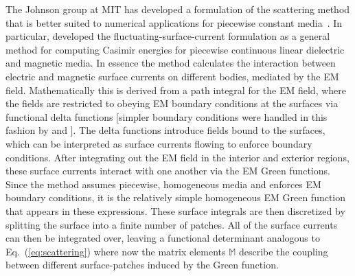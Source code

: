The Johnson group at MIT has developed a formulation of the scattering method that is better suited to numerical 
applications for piecewise constant media~\citep{Rodriguez2007,Rodriguez2007a, Rodriguez2009,Reid2009,Reid2011, Reid2013}.  
In particular, \citet{Reid2009,Reid2011, Reid2013} developed the fluctuating-surface-current formulation as a general method for computing Casimir
energies for piecewise continuous linear dielectric and magnetic media.  
In essence the method calculates the interaction between electric and magnetic surface currents 
on different bodies, mediated by the EM field.  Mathematically this is derived 
from a path integral for the EM field, where the fields are restricted to obeying EM boundary conditions at the 
surfaces via functional delta functions [simpler boundary conditions were handled in this fashion by
\citet{Bordag1985} and \citet{Li1991}].  The delta functions introduce fields 
bound to the surfaces, which can be interpreted as surface currents flowing to enforce boundary conditions.
After integrating out the EM field in the interior and exterior regions, 
these surface currents interact with one another via the EM Green functions.
Since the method assumes piecewise, homogeneous media and enforces EM boundary
conditions, it is the relatively simple homogeneous EM Green function that appears in these expressions.
These surface integrals are then discretized by splitting the surface into a finite number of patches.
All of the surface currents can then be integrated over, leaving a functional determinant analogous to Eq.~(\ref{eq:scattering})
where now the matrix elements $\mathbb{M}$ describe the coupling between different surface-patches induced
by the Green function.  

